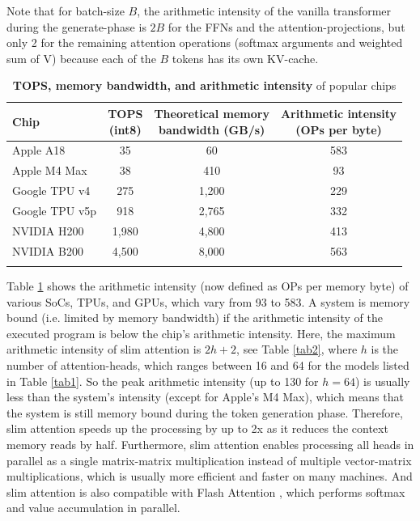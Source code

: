\documentclass{article}
\def\fline{\Xhline{2\arrayrulewidth}}              %
\begin{document}
Note that for batch-size $B$, the arithmetic intensity of the vanilla transformer during the generate-phase is $2B$ for the FFNs and the attention-projections, but only 2 for the remaining attention operations (softmax arguments and weighted sum of V) because each of the $B$ tokens has its own KV-cache.
\begin{table}[h!] \centering
\caption{\textbf{TOPS, memory bandwidth, and arithmetic intensity} of popular chips}
\begin{tabular}{lccc} \fline
  Chip & \makecell{TOPS \\ (int8)} & \makecell{Theoretical memory \\ bandwidth (GB/s)} & \makecell{Arithmetic intensity \\ (OPs per byte)} \\ \hline
  Apple A18 \citep{apple-wiki}     & 35     & 60      & 583 \\
  Apple M4 Max \citep{apple-wiki}  & 38     & 410     & 93  \\
  Google TPU v4 \citep{TPU-wiki}   & 275    & 1,200   & 229 \\
  Google TPU v5p \citep{TPU-wiki}  & 918    & 2,765   & 332 \\
  NVIDIA H200 \citep{nvidia-wiki}  & 1,980  & 4,800   & 413 \\
  NVIDIA B200 \citep{nvidia-wiki}  & 4,500  & 8,000   & 563 \\ \fline
\end{tabular} \label{tab3} \end{table}

Table \ref{tab3} shows the arithmetic intensity (now defined as OPs per memory byte) of various SoCs, TPUs, and GPUs, which vary from 93 to 583. A system is memory bound (i.e. limited by memory bandwidth) if the arithmetic intensity of the executed program is below the chip’s arithmetic intensity. Here, the maximum arithmetic intensity of slim attention is $2h+2$, see Table \ref{tab2}, where $h$ is the number of attention-heads, which ranges between 16 and 64 for the models listed in Table \ref{tab1}. So the peak arithmetic intensity (up to 130 for $h = 64$) is usually less than the system’s intensity (except for Apple's M4 Max), which means that the system is still memory bound during the token generation phase. Therefore, slim attention speeds up the processing by up to 2x as it reduces the context memory reads by half. Furthermore, slim attention enables processing all heads in parallel as a single matrix-matrix multiplication instead of multiple vector-matrix multiplications, which is usually more efficient and faster on many machines. And slim attention is also compatible with Flash Attention \citep{flash-attention}, which performs softmax and value accumulation in parallel.
\end{document}
